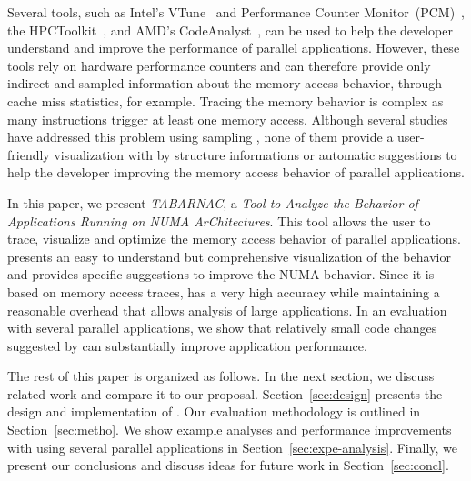Several tools, such as Intel's VTune~\cite{Reinders05VTune} and Performance Counter Monitor~(PCM)~\cite{Intel2012b}, the HPCToolkit~\cite{Adhianto10HPCTOOLKIT}, and AMD's CodeAnalyst~\cite{Drongowski2008}, can be used to help the
developer understand and improve the performance of parallel applications.
However, these tools rely on hardware performance counters and can therefore provide only indirect and sampled information about the memory access behavior, through cache miss statistics, for example.
Tracing the memory behavior is complex as many instructions trigger at least one memory access.
Although several studies have addressed this problem using sampling
\cite{Lachaize12MemProf,McCurdy2010}, none of them provide a user-friendly
visualization with by structure informations or automatic suggestions to help
the developer improving the memory access behavior of parallel applications.

In this paper, we present \emph{TABARNAC}, a \emph{Tool to Analyze the Behavior of
Applications Running on NUMA ArChitectures}. This tool allows the user to
trace, visualize and optimize the memory access behavior of parallel applications.
\TABARNAC presents an easy to understand but comprehensive visualization of the behavior and
provides specific suggestions to improve the NUMA behavior.
Since it is based on memory access traces, \TABARNAC has a very high accuracy while maintaining a reasonable overhead that allows analysis of large applications.
In an evaluation with several parallel applications, we show that relatively small code changes suggested by \TABARNAC can substantially improve application performance.

The rest of this paper is organized as follows.
In the next section, we discuss related work and compare it to our proposal.
Section~\ref{sec:design} presents the design and implementation of \TABARNAC.
Our evaluation methodology is outlined in Section~\ref{sec:metho}.
We show example analyses and performance improvements with \TABARNAC using several parallel applications in Section~\ref{sec:expe-analysis}.
Finally, we present our conclusions and discuss ideas for future work in Section~\ref{sec:concl}.
